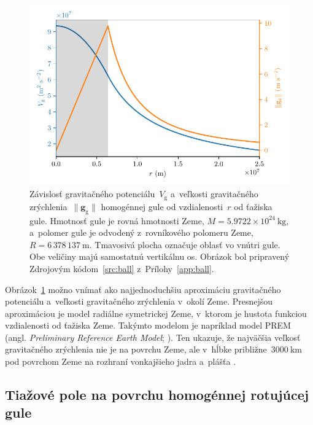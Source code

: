 \documentclass[a4paper, 12pt]{book}
\newcommand{\gidx}{\mathrm g}
\let\vec\mathbf
\begin{document}
\begin{figure}[bt]
\centering
\includegraphics{./fig-homogeneous-ball-vg-gg.pdf}
\caption{Závislosť gravitačného potenciálu~$V_\gidx$ a~veľkosti gravitačného 
zrýchlenia~$\| \vec g_\gidx \|$ homogénnej gule od vzdialenosti~$r$ od ťažiska 
gule.  Hmotnosť gule je rovná hmotnosti Zeme, $M = 5.9722 \times 10^{24} 
\ \mathrm{kg}$, a~polomer gule je odvodený z~rovníkového polomeru Zeme, $R 
= 6\,378\,137\ \mathrm{m}$.  Tmavosivá plocha označuje oblasť vo vnútri gule.  
Obe veličiny majú samostatnú vertikálnu os.  Obrázok bol pripravený Zdrojovým 
kódom~\ref{src:ball} z~Prílohy~\ref{app:ball}.}
\label{fig:homogeneous_ball_plot}
\end{figure}

Obrázok~\ref{fig:homogeneous_ball_plot} možno vnímať ako najjednoduchšiu 
aproximáciu gravitačného potenciálu a~veľkosti gravitačného zrýchlenia v~okolí 
Zeme.  Presnejšou aproximáciou je model radiálne symetrickej Zeme, v~ktorom je 
hustota funkciou vzdialenosti od ťažiska Zeme.  Takýmto modelom je napríklad 
model PREM (angl. \emph{Preliminary Reference Earth Model}; 
\cite{Dziewonski1981}).  Ten ukazuje, že najväčšia veľkosť gravitačného 
zrýchlenia nie je na povrchu Zeme, ale v~hĺbke približne~$3000\ \mathrm{km}$ 
pod povrchom Zeme na rozhraní vonkajšieho jadra a~plášťa \parencite[pozri 
napríklad][]{TorgeGeodesy,Lowrie2007}.

\subsection{Tiažové pole na povrchu homogénnej rotujúcej gule}
\label{sec:homogeneous_ball_gravity_field}
\end{document}

